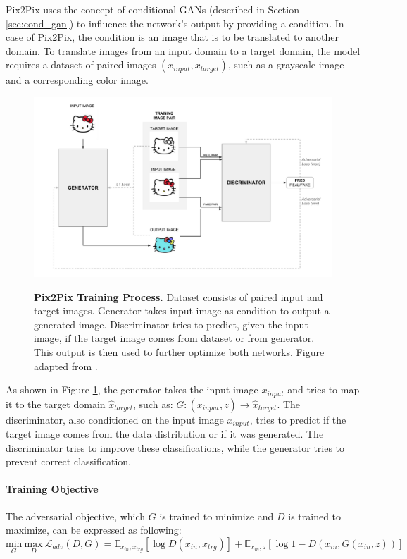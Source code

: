 \documentclass[12pt]{report}
\begin{document}
Pix2Pix uses the concept of conditional GANs \cite{mirza_conditional_2014} (described in Section \ref{sec:cond_gan}) to influence the network's output by providing a condition. In case of Pix2Pix, the condition is an image that is to be translated to another domain. To translate images from an input domain to a target domain, the model requires a dataset of paired images $(x_{input}, x_{target})$, such as a grayscale image and a corresponding color image. 


\begin{figure}[h]
\centering
{\includegraphics[width=\linewidth]{03_analysis/gans/pix2pix}}
\caption{\label{fig:pix2pix} \textbf{Pix2Pix Training Process.} Dataset consists of paired input and target images. Generator takes input image as condition to output a generated image. Discriminator tries to predict, given the input image, if the target image comes from dataset or from generator. This output is then used to further optimize both networks. Figure adapted from \cite{hesse_image--image_2017}.}
\end{figure}

As shown in Figure \ref{fig:pix2pix}, the generator takes the input image $x_{input}$ and tries to map it to the target domain $\hat{x}_{target}$, such as: $G: (x_{input}, z) \rightarrow \hat{x}_{target}$. The discriminator, also conditioned on the input image $x_{input}$, tries to predict if the target image comes from the data distribution or if it was generated. The discriminator tries to improve these classifications, while the generator tries to prevent correct classification.


\paragraph{Training Objective}
The adversarial objective, which $G$ is trained to minimize and $D$ is trained to maximize, can be expressed as following:
\begin{equation}
\underset{G}{\mathrm{min}} \ \underset{D}{\mathrm{max}} \ \mathcal{L}_{adv}(D,G) = \mathbb{E}_{x_{in},x_{trg}}[\log D(x_{in},x_{trg})] + \mathbb{E}_{x_{in},z}[\log 1 - D(x_{in}, G(x_{in},z))]
\label{eq:pix2pix_minimax_cond}
\end{equation}
\end{document}
